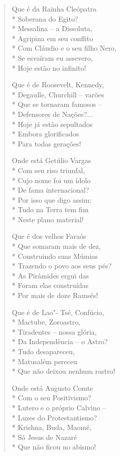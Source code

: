 \begin{verse}
Que é da Rainha Cleópatra\\*
Soberana do Egito?\\*
Messalina --  a Dissoluta,\\*
Agripina em seu conflito\\*
Com Cláudio e o seu filho Nero,\\*
Se esvaíram eu assevero,\\*
Hoje estão no infinito!

Que é de Roosevelt, Kennedy,\\*
Degaulle, Churchill --  varões\\*
Que se tornaram famosos --\\*
Defensores de Nações?...\\*
Hoje já estão sepultados\\*
Embora glorificados\\*
Para todas gerações!

Onde está Getúlio Vargas\\*
Com seu riso triunfal,\\*
Cujo nome foi um ídolo\\*
De fama internacional?\\*
Por isso que digo assim:\\*
Tudo na Terra tem fim\\*
Neste plano material!

Que é dos velhos Faraós\\*
Que somaram mais de dez,\\*
Construindo suas Múmias\\*
Trazendo o povo aos seus pés?\\*
As Pirâmides ergui das\\*
Foram elas construídas\\*
Por mais de doze Ramsés!

Que é de Lao"- Tsé, Confúcio,\\*
Mactube, Zoroastro,\\*
Tiradentes --  nossa glória,\\*
Da Independência --  o Astro?\\*
Tudo desapareceu,\\*
Matusalém pereceu\\*
Que não deixou nenhum rastro!

Onde está Augusto Comte\\*
Com o seu Positivismo?\\*
Lutero e o próprio Calvino  --\\*
Luzes do Protestantismo?\\*
Krishna, Buda, Maomé,\\*
Só Jesus de Nazaré\\*
Que não ficou no abismo!


\end{verse}
